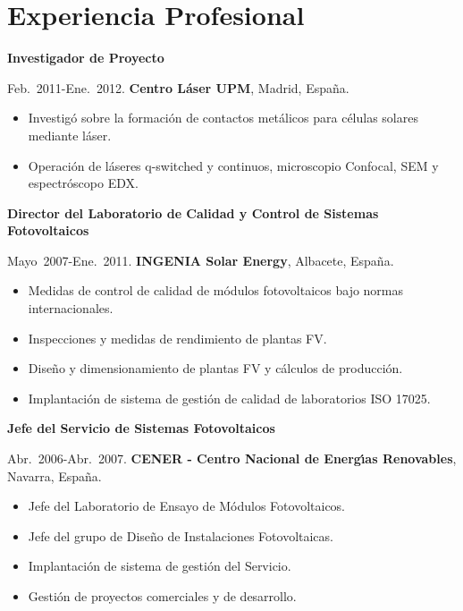\documentclass{article}
\begin{document}

\section*{Experiencia Profesional}

{\bf Investigador de Proyecto}

\medskip
Feb.~2011-Ene.~2012.
{\bf Centro L\'aser UPM},
Madrid, Espa\~na.

\begin{itemize}\itemsep 0pt
\item Investig\'o sobre la formaci\'on de contactos met\'alicos para c\'elulas solares mediante l\'aser.
\item Operaci\'on de l\'aseres q-switched y continuos, microscopio Confocal, SEM y espectr\'oscopo EDX.
\end{itemize}

{\bf Director del Laboratorio de Calidad y Control de Sistemas Fotovoltaicos}

\medskip
Mayo~2007-Ene.~2011.
{\bf INGENIA Solar Energy},
Albacete, Espa\~na.

\begin{itemize}\itemsep 0pt
\item Medidas de control de calidad de m\'odulos fotovoltaicos bajo normas internacionales.
\item Inspecciones y medidas de rendimiento de plantas FV.
\item Dise\~no y dimensionamiento de plantas FV y c\'alculos de producci\'on.
\item Implantaci\'on de sistema de gesti\'on de calidad de laboratorios ISO 17025.
\end{itemize}

{\bf Jefe del Servicio de Sistemas Fotovoltaicos}

\medskip
Abr.~2006-Abr.~2007. 
{\bf CENER - Centro Nacional de Energ\'{\i}as Renovables},
Navarra, Espa\~na.

\begin{itemize}\itemsep 0pt
\item Jefe del Laboratorio de Ensayo de M\'odulos Fotovoltaicos.
\item Jefe del grupo de Dise\~no de Instalaciones Fotovoltaicas.
\item Implantaci\'on de sistema de gesti\'on del Servicio.
\item Gesti\'on de proyectos comerciales y de desarrollo.
\end{itemize}
\end{document}
